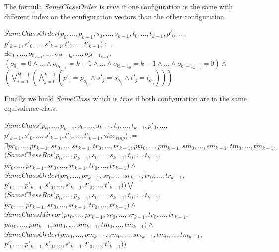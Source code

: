 \documentclass{article}
\begin{document}
\noindent The formula $SameClassOrder$ is $true$ if one configuration is the same with different index on the configuration vectors than the other configuration.

\begin{center}
    
    $SameClassOrder (p_{0}, \dots, p_{k-1}, s_{0}, \dots, s_{k-1}, t_{0}, \dots, t_{k-1}, p'_{0}, \dots,$\\
    $p'_{k-1}, s'_{0}, \dots, s'_{k-1}, t'_{0}, \dots, t'_{k-1}):=$\\
    $\exists o_{0_{1}},\dots, o_{0_{k-1}}, \dots, o_{k!-1_{0}}, \dots, o_{k!-1_{k-1}},$\\
    $ ( o_{0_{1}} = 0 \land \dots \land o_{0_{k-1}} = k-1 \land \dots \land o_{k!-1_{0}} = k-1 \land \dots \land o_{k!-1_{k-1}} = 0 ) \land $\\
    $ (\bigvee_{i=0}^{k!-1}  (\bigwedge_{j=0}^{k-1}  (p'_{j} = p_{o_{i_{j}}} \land s'_{j} = s_{o_{i_{j}}} \land t'_{j} = t_{o_{i_{j}}}  ) ) )$
\end{center}

\noindent Finally we build $SameClass$ which is $true$ if both configuration are in the same equivalence class.

\begin{center}
    
    $SameClass (p_{0}, \dots, p_{k-1}, s_{0}, \dots, s_{k-1}, t_{0}, \dots, t_{k-1}, p'_{0}, \dots,$\\
    $p'_{k-1}, s'_{0}, \dots, s'_{k-1}, t'_{0}, \dots, t'_{k-1}, size_{ring}):=$\\
    $\exists pr_{0}, \dots, pr_{k-1}, sr_{0}, \dots, sr_{k-1}, tr_{0}, \dots, tr_{k-1}, pm_{0}, \dots, pm_{k-1}, sm_{0}, \dots, sm_{k-1}, tm_{0}, \dots, tm_{k-1},$\\
    $ (SameClassRot (p_{0}, \dots, p_{k-1}, s_{0}, \dots, s_{k-1}, t_{0}, \dots, t_{k-1},$\\
    $pr_{0}, \dots, pr_{k-1}, sr_{0}, \dots, sr_{k-1}, tr_{0}, \dots, tr_{k-1}) \land$\\
    $SameClassOrder (pr_{0}, \dots, pr_{k-1}, sr_{0}, \dots, sr_{k-1}, tr_{0}, \dots, tr_{k-1},$\\$
    p'_{0}, \dots, p'_{k-1}, s'_{0}, \dots, s'_{k-1}, t'_{0}, \dots, t'_{k-1}))\bigvee$\\
    $ (SameClassRot (p_{0}, \dots, p_{k-1}, s_{0}, \dots, s_{k-1}, t_{0}, \dots, t_{k-1},$\\
    $pr_{0}, \dots, pr_{k-1}, sr_{0}, \dots, sr_{k-1}, tr_{0}, \dots, tr_{k-1}) \land$\\
    $SameClassMirror (pr_{0}, \dots, pr_{k-1}, sr_{0}, \dots, sr_{k-1}, tr_{0}, \dots, tr_{k-1},$\\
    $pm_{0}, \dots, pm_{k-1}, sm_{0}, \dots, sm_{k-1}, tm_{0}, \dots, tm_{k-1})\land$\\
    $SameClassOrder (pm_{0}, \dots, pm_{k-1}, sm_{0}, \dots, sm_{k-1}, tm_{0}, \dots, tm_{k-1},$\\
    $p'_{0}, \dots,p'_{k-1}, s'_{0}, \dots, s'_{k-1}, t'_{0}, \dots, t'_{k-1}) )$
\end{center}
\end{document}

